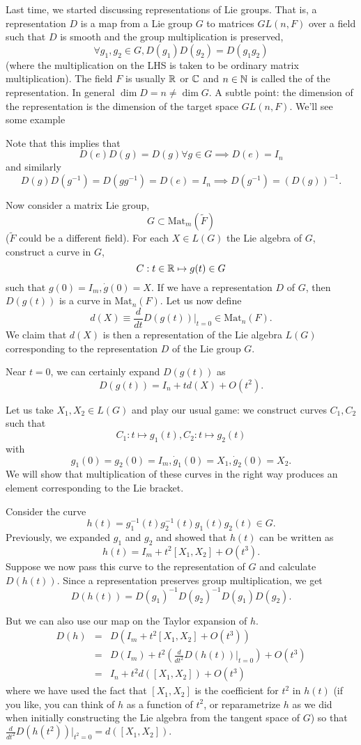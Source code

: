 Last time, we started discussing representations of Lie groups. That is, a representation $D$ is a map from a Lie group $G$ to matrices $GL(n,F)$ over a field such that $D$ is smooth and the group multiplication is preserved,
$$\forall g_1,g_2\in G, D(g_1)D(g_2)=D(g_1g_2)$$
(where the multiplication on the LHS is taken to be ordinary matrix multiplication). The field $F$ is usually $\mathbb{R}$ or $\mathbb{C}$ and $n\in\mathbb{N}$ is called the  of the representation. In general $\dim D = n \neq \dim G$. A subtle point: the dimension of the representation is the dimension of the target space $GL(n,F)$. We'll see some example

Note that this implies that
$$D(e)D(g)=D(g)\forall g\in G \implies D(e)=I_n$$
and similarly
$$D(g)D(g^{-1})=D(gg^{-1})=D(e)=I_n\implies D(g^{-1})=(D(g))^{-1}.$$

Now consider a matrix Lie group,
$$G\subset \text{Mat}_m(\tilde F)$$ ($\tilde F$ could be a different field). For each $X\in L(G)$ the Lie algebra of $G$, construct a curve in $G$,
$$C:t\in \mathbb{R} \mapsto g(t)\in G$$ such that $g(0)=I_m,\dot g(0)=X$. If we have a representation $D$ of $G$, then $D(g(t))$ is a curve in $\text{Mat}_n(F).$ Let us now define
$$d(X)\equiv \frac{d}{dt}D(g(t))|_{t=0}\in \text{Mat}_n(F).$$
We claim that $d(X)$ is then a representation of the Lie algebra $L(G)$ corresponding to the representation $D$ of the Lie group $G$.

Near $t=0$, we can certainly expand $D(g(t))$ as
$$D(g(t))=I_n+t d(X)+O(t^2).$$

Let us take $X_1,X_2\in L(G)$ and play our usual game: we construct curves $C_1,C_2$ such that
$$C_1:t\mapsto g_1(t),C_2:t\mapsto g_2(t)$$
with
$$g_1(0)=g_2(0)=I_m, \dot g_1(0)=X_1, \dot g_2(0)=X_2.$$
We will show that multiplication of these curves in the right way produces an element corresponding to the Lie bracket.

Consider the curve
$$h(t)=g_1^{-1}(t)g_2^{-1}(t) g_1(t) g_2(t) \in G.$$
Previously, we expanded $g_1$ and $g_2$ and showed that $h(t)$ can be written as
$$h(t)=I_m+t^2[X_1,X_2]+O(t^3).$$
Suppose we now pass this curve to the representation of $G$ and calculate $D(h(t))$. Since a representation preserves group multiplication, we get
$$D(h(t))=D(g_1)^{-1}D(g_2)^{-1}D(g_1)D(g_2).$$

But we can also use our map on the Taylor expansion of $h$.
\begin{eqnarray*}
D(h)&=& D(I_m+ t^2[X_1,X_2]+O(t^3))\\
&=&D(I_m)+t^2 \left(\frac{d}{dt^2} D(h(t))|_{t=0}\right)+O(t^3)\\
&=&I_n +t^2 d([X_1,X_2])+O(t^3)
\end{eqnarray*}
where we have used the fact that $[X_1,X_2]$ is the coefficient for $t^2$ in $h(t)$ (if you like, you can think of $h$ as a function of $t^2$, or reparametrize $h$ as we did when initially constructing the Lie algebra from the tangent space of $G$) so that $\frac{d}{dt^2}D(h(t^2))|_{t^2=0}=d([X_1,X_2]).$

